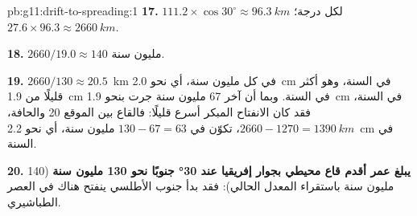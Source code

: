 \begin{solution}{pb:g11:drift-to-spreading:1}
\textbf{17.} $111.2 \times \cos 30^\circ \approx \qty{96.3}{km}$ لكل درجة؛
$27.6 \times 96.3 \approx \qty{2660}{km}$.

\textbf{18.} $2660/19.0 \approx 140$ مليون سنة.

\textbf{19.} $2660/130 \approx \num{20.5}$~\unit{km} في كل مليون سنة، أي نحو
\qty{2.0}{cm} في السنة، وهو أكثر قليلًا من \qty{1.9}{cm} في السنة. وبما أن آخر
67 مليون سنة جرت بنحو \qty{1.9}{cm} في السنة، فقد كان الانفتاح المبكر
أسرع قليلًا: فالقاع بين الموقع 20 والحافة، $2660 - 1270 =
\qty{1390}{km}$، تكوّن في $130 - 67 = 63$ مليون سنة، أي نحو
\qty{2.2}{cm} في السنة.

\textbf{20.} \textbf{يبلغ عمر أقدم قاع محيطي بجوار إفريقيا عند \ang{30} جنوبًا
نحو 130 مليون سنة} (140 مليون سنة باستقراء المعدل
الحالي): فقد بدأ جنوب الأطلسي ينفتح هناك في العصر الطباشيري.
\end{solution}
